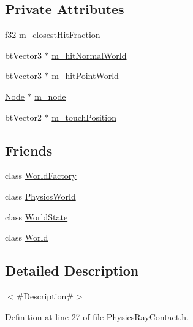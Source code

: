 \subsection*{Private Attributes}
\begin{DoxyCompactItemize}
\item 
\mbox{\hyperlink{_util_8h_a5f6906312a689f27d70e9d086649d3fd}{f32}} \mbox{\hyperlink{classnjli_1_1_physics_ray_contact_ab45c460f290a435ea879528f4dd5b372}{m\+\_\+closest\+Hit\+Fraction}}
\item 
bt\+Vector3 $\ast$ \mbox{\hyperlink{classnjli_1_1_physics_ray_contact_a3cc7540d9aff7dad7860e6910aad7b41}{m\+\_\+hit\+Normal\+World}}
\item 
bt\+Vector3 $\ast$ \mbox{\hyperlink{classnjli_1_1_physics_ray_contact_a8bb6d7b4281cb7a5f36e28f87d1a2d77}{m\+\_\+hit\+Point\+World}}
\item 
\mbox{\hyperlink{classnjli_1_1_node}{Node}} $\ast$ \mbox{\hyperlink{classnjli_1_1_physics_ray_contact_ae315ed84ad9ab0f019a7a515f5a30f34}{m\+\_\+node}}
\item 
bt\+Vector2 $\ast$ \mbox{\hyperlink{classnjli_1_1_physics_ray_contact_ad676d79b15af074e79631759e42f59aa}{m\+\_\+touch\+Position}}
\end{DoxyCompactItemize}
\subsection*{Friends}
\begin{DoxyCompactItemize}
\item 
class \mbox{\hyperlink{classnjli_1_1_physics_ray_contact_acb96ebb09abe8f2a37a915a842babfac}{World\+Factory}}
\item 
class \mbox{\hyperlink{classnjli_1_1_physics_ray_contact_abd7959b8cbcd7c25bc6c0c8b1ea26ce6}{Physics\+World}}
\item 
class \mbox{\hyperlink{classnjli_1_1_physics_ray_contact_a59cdb6fe5b378389e35b8b2a2f4e990e}{World\+State}}
\item 
class \mbox{\hyperlink{classnjli_1_1_physics_ray_contact_a7b4bcdf992c21ae83363f25df05b1d25}{World}}
\end{DoxyCompactItemize}


\subsection{Detailed Description}
$<$\#\+Description\#$>$ 

Definition at line 27 of file Physics\+Ray\+Contact.\+h.



